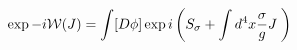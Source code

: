 \begin{equation}
\exp -i\mathcal{W}(J)=\int [D\phi ]\exp i\left( S_{\sigma }+\int d^{4}x\frac{%
\sigma }{g}J\;\right)  \label{wjs}
\end{equation}

